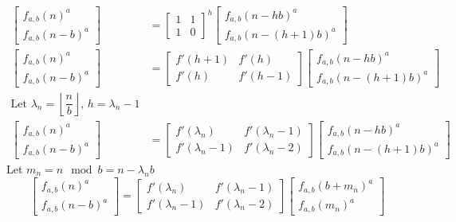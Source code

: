 \documentclass[preprint,12pt]{elsarticle}
\begin{document}
\begin{align*}
	\begin{bmatrix}f_{a,b}(n)^a \\f_{a,b}(n - b)^a\end{bmatrix}
	&=
	\begin{bmatrix}1 & 1\\1 & 0\end{bmatrix}^h
	\begin{bmatrix}f_{a,b}(n - hb)^a\\f_{a,b}(n-(h+1)b)^a\end{bmatrix}\\
	\begin{bmatrix}f_{a,b}(n)^a \\f_{a,b}(n - b)^a\end{bmatrix}
	&=
	\begin{bmatrix}f'(h+1) & f'(h)\\f'(h) & f'(h-1)\end{bmatrix}
	\begin{bmatrix}f_{a,b}(n - hb)^a\\f_{a,b}(n-(h+1)b)^a\end{bmatrix}\\
	\text{Let $\lambda_{n}=\left\lfloor\dfrac{n}{b}\right\rfloor$, $h = \lambda_{n} - 1$}\\
	\begin{bmatrix}f_{a,b}(n)^a \\f_{a,b}(n - b)^a\end{bmatrix}
	&=
	\begin{bmatrix}f'(\lambda_n) & f'(\lambda_{n}-1)\\f'(\lambda_n-1) & f'(\lambda_n-2)\end{bmatrix}
	\begin{bmatrix}f_{a,b}(n - hb)^a\\f_{a,b}(n-(h+1)b)^a\end{bmatrix}
\end{align*}
Let $m_n = n \mod b = n - \lambda_nb$\\
$$\begin{bmatrix}f_{a,b}(n)^a \\f_{a,b}(n - b)^a\end{bmatrix}
=
\begin{bmatrix}f'(\lambda_n) & f'(\lambda_{n}-1)\\f'(\lambda_n-1) & f'(\lambda_n-2)\end{bmatrix}
\begin{bmatrix}f_{a,b}(b+m_n)^a\\f_{a,b}(m_n)^a\end{bmatrix}$$
\end{document}
